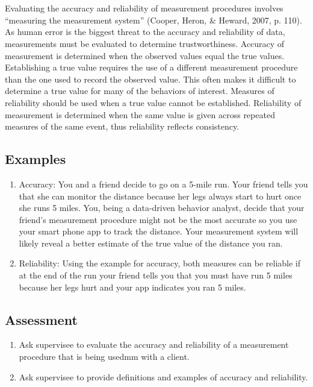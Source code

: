 \clearpage \section[\fouraNine{}]{\fouraNine{}%
              }
Evaluating the accuracy and reliability of measurement procedures involves ``measuring the measurement system'' (Cooper, Heron, \& Heward, 2007, p. 110). As human error is the biggest threat to the accuracy and reliability of data, measurements must be evaluated to determine trustworthiness.  Accuracy of measurement is determined when the observed values equal the true values.  Establishing a true value requires the use of a different measurement procedure than the one used to record the observed value.  This often makes it difficult to determine a true value for many of the behaviors of interest.  Measures of reliability should be used when a true value cannot be established.  Reliability of measurement is determined when the same value is given across repeated measures of the same event, thus reliability reflects consistency. 
%
\subsection{Examples}
\begin{enumerate}
\item Accuracy: You and a friend decide to go on a 5-mile run.  Your friend tells you that she can monitor the distance because her legs always start to hurt once she runs 5 miles.  You, being a data-driven behavior analyst, decide that your friend's measurement procedure might not be the most accurate so you use your smart phone app to track the distance.  Your measurement system will likely reveal a better estimate of the true value of the distance you ran.
\item Reliability: Using the example for accuracy, both measures can be reliable if at the end of the run your friend tells you that you must have run 5 miles because her legs hurt and your app indicates you ran 5 miles.   
\end{enumerate}
%
\subsection{Assessment}
\begin{enumerate}
\item Ask supervisee to evaluate the accuracy and reliability of a measurement procedure that is being usedmm with a client.
\item Ask supervisee to provide definitions and examples of accuracy and reliability.
\end{enumerate}
%
